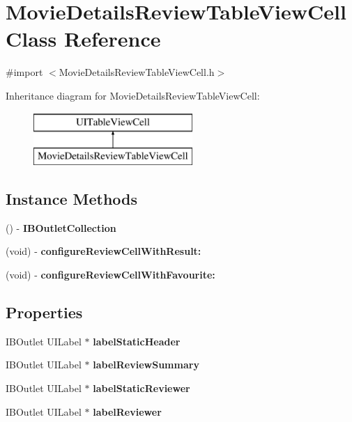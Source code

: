 \section{Movie\+Details\+Review\+Table\+View\+Cell Class Reference}
\label{interface_movie_details_review_table_view_cell}


{\ttfamily \#import $<$Movie\+Details\+Review\+Table\+View\+Cell.\+h$>$}

Inheritance diagram for Movie\+Details\+Review\+Table\+View\+Cell\+:\begin{figure}[H]
\begin{center}
\leavevmode
\includegraphics[height=2.000000cm]{interface_movie_details_review_table_view_cell}
\end{center}
\end{figure}
\subsection*{Instance Methods}
\begin{DoxyCompactItemize}
\item 
() -\/ {\bfseries I\+B\+Outlet\+Collection}\label{interface_movie_details_review_table_view_cell_aa6389391da761fdd761de586f446676b}

\item 
(void) -\/ {\bf configure\+Review\+Cell\+With\+Result\+:}
\item 
(void) -\/ {\bf configure\+Review\+Cell\+With\+Favourite\+:}
\end{DoxyCompactItemize}
\subsection*{Properties}
\begin{DoxyCompactItemize}
\item 
I\+B\+Outlet U\+I\+Label $\ast$ {\bfseries label\+Static\+Header}\label{interface_movie_details_review_table_view_cell_ac85081bbe378b56ed25f1516196b4866}

\item 
I\+B\+Outlet U\+I\+Label $\ast$ {\bfseries label\+Review\+Summary}\label{interface_movie_details_review_table_view_cell_af68fd93b26a12239446004245149cf8a}

\item 
I\+B\+Outlet U\+I\+Label $\ast$ {\bfseries label\+Static\+Reviewer}\label{interface_movie_details_review_table_view_cell_a13620720bcf1101be0b45529a4c46ace}

\item 
I\+B\+Outlet U\+I\+Label $\ast$ {\bfseries label\+Reviewer}\label{interface_movie_details_review_table_view_cell_adb7071a1131ec15ba4907e80094ead06}

\end{DoxyCompactItemize}


